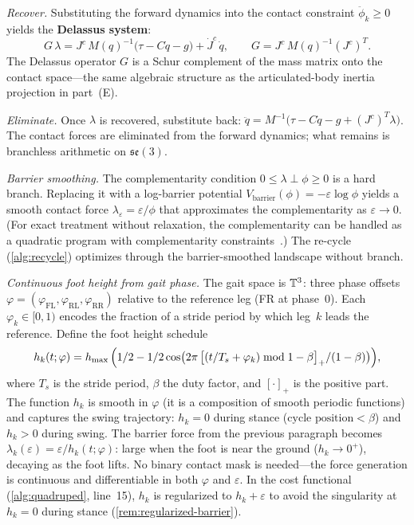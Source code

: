 \medskip\noindent\emph{Recover.}
Substituting the forward dynamics into the contact constraint
$\ddot{\phi}_k \geq 0$ yields the \textbf{Delassus system}:
\[
G\,\lambda = J^c\, M(q)^{-1}\bigl(\tau - C\dot{q} - g\bigr)
  + \dot{J}^c\,\dot{q},
\qquad G = J^c\, M(q)^{-1} (J^c)^T.
\]
The Delassus operator $G$ is a Schur complement of the mass matrix
onto the contact space---the same algebraic structure as the
articulated-body inertia projection in part~(E).

\medskip\noindent\emph{Eliminate.}
Once $\lambda$ is recovered, substitute back:
$\ddot{q} = M^{-1}\bigl(\tau - C\dot{q} - g + (J^c)^T\lambda\bigr)$.
The contact forces are eliminated from the forward dynamics; what
remains is branchless arithmetic on $\mathfrak{se}(3)$.

\medskip\noindent\emph{Barrier smoothing.}
The complementarity condition $0 \leq \lambda \perp \phi \geq 0$ is a
hard branch.
Replacing it with a log-barrier potential
$V_{\mathrm{barrier}}(\phi) = -\varepsilon\log\phi$ yields a smooth
contact force $\lambda_\varepsilon = \varepsilon / \phi$ that
approximates the complementarity as $\varepsilon \to 0$.
(For exact treatment without relaxation, the complementarity can be
handled as a quadratic program with complementarity
constraints~\cite{MenagerCarpentier2025}.)
The re-cycle (\cref{alg:recycle}) optimizes through the barrier-smoothed
landscape without branch.

\medskip\noindent\emph{Continuous foot height from gait phase.}
The gait space is $\bT^3$: three phase offsets
$\varphi = (\varphi_{\mathrm{FL}}, \varphi_{\mathrm{RL}}, \varphi_{\mathrm{RR}})$
relative to the reference leg (FR at phase~$0$).
Each $\varphi_k \in [0,1)$ encodes the fraction of a stride period by which
leg~$k$ leads the reference.
Define the foot height schedule
\begin{equation}\label{eq:foot-height}
h_k(t;\varphi) = h_{\max}\,\Bigl(
  \tfrac{1}{2} - \tfrac{1}{2}\cos\bigl(
    2\pi\,\bigl[(t/T_s + \varphi_k) \bmod 1 - \beta\bigr]_+ / (1-\beta)
  \bigr)
\Bigr),
\end{equation}
where $T_s$ is the stride period, $\beta$ the duty factor, and $[\cdot]_+$
is the positive part.
The function $h_k$ is smooth in $\varphi$ (it is a composition of smooth
periodic functions) and captures the swing trajectory: $h_k = 0$ during
stance ($\text{cycle position} < \beta$) and $h_k > 0$ during swing.
The barrier force from the previous paragraph becomes
$\lambda_k(\varepsilon) = \varepsilon / h_k(t;\varphi)$:
large when the foot is near the ground ($h_k \to 0^+$), decaying as
the foot lifts.
No binary contact mask is needed---the force generation is continuous and
differentiable in both $\varphi$ and $\varepsilon$.
In the cost functional (\cref{alg:quadruped}, line~15), $h_k$ is regularized to
$h_k + \varepsilon$ to avoid the singularity at $h_k = 0$ during
stance (\cref{rem:regularized-barrier}).

